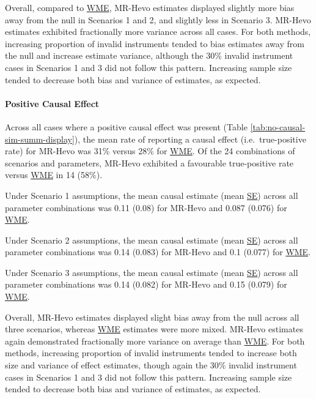 \documentclass[
]{article}
\begin{document}
Overall, compared to \hyperref[acronyms_WME]{WME}, MR-Hevo estimates displayed slightly more bias away from the null in Scenarios 1 and 2, and slightly less in Scenario 3. MR-Hevo estimates exhibited fractionally more variance across all cases. For both methods, increasing proportion of invalid instruments tended to bias estimates away from the null and increase estimate variance, although the 30\% invalid instrument cases in Scenarios 1 and 3 did not follow this pattern. Increasing sample size tended to decrease both bias and variance of estimates, as expected.

\paragraph{Positive Causal Effect}\label{results-sim-causal}

\leavevmode\newline Across all cases where a positive causal effect was present (Table \ref{tab:no-causal-sim-summ-display}), the mean rate of reporting a causal effect (i.e.~true-positive rate) for MR-Hevo was 31\% versus 28\% for \hyperref[acronyms_WME]{WME}. Of the 24 combinations of scenarios and parameters, MR-Hevo exhibited a favourable true-positive rate versus \hyperref[acronyms_WME]{WME} in 14 (58\%).

Under Scenario 1 assumptions, the mean causal estimate (mean \hyperref[acronyms_SE]{SE}) across all parameter combinations was 0.11 (0.08) for MR-Hevo and 0.087 (0.076) for \hyperref[acronyms_WME]{WME}.

Under Scenario 2 assumptions, the mean causal estimate (mean \hyperref[acronyms_SE]{SE}) across all parameter combinations was 0.14 (0.083) for MR-Hevo and 0.1 (0.077) for \hyperref[acronyms_WME]{WME}.

Under Scenario 3 assumptions, the mean causal estimate (mean \hyperref[acronyms_SE]{SE}) across all parameter combinations was 0.14 (0.082) for MR-Hevo and 0.15 (0.079) for \hyperref[acronyms_WME]{WME}.

Overall, MR-Hevo estimates displayed slight bias away from the null across all three scenarios, whereas \hyperref[acronyms_WME]{WME} estimates were more mixed. MR-Hevo estimates again demonstrated fractionally more variance on average than \hyperref[acronyms_WME]{WME}. For both methods, increasing proportion of invalid instruments tended to increase both size and variance of effect estimates, though again the 30\% invalid instrument cases in Scenarios 1 and 3 did not follow this pattern. Increasing sample size tended to decrease both bias and variance of estimates, as expected.
\end{document}
